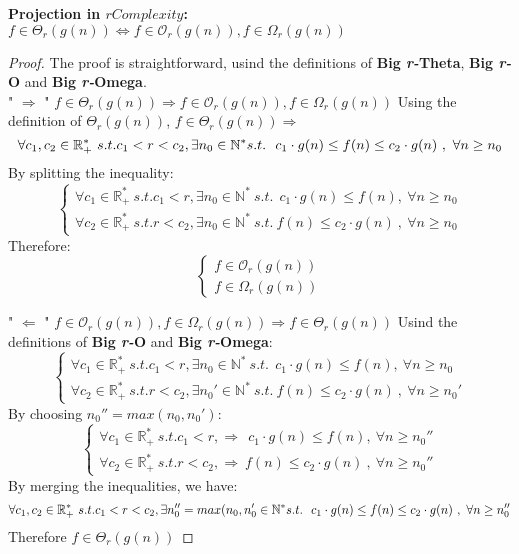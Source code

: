 \begin{theorem}
    \textbf{Projection in $rComplexity$:}  \\  $ f \in \Theta_{r}(g(n)) \Leftrightarrow f \in \mathcal{O}_{r}(g(n)), f \in \Omega_{r}(g(n)) $
\end{theorem}
\begin{proof}
    The proof is straightforward, usind the definitions of \textbf{Big \textit{r-}Theta}, \textbf{Big \textit{r-}O} and \textbf{Big \textit{r-}Omega}. \\
    " $\Rightarrow$ " $ f \in \Theta_{r}(g(n)) \Rightarrow f \in \mathcal{O}_{r}(g(n)), f \in \Omega_{r}(g(n)) $
    Using the definition of $\Theta_{r}(g(n))$, $ f \in \Theta_{r}(g(n)) \Rightarrow$
    \[\forall c_{1}, c_{2} \in \mathbb{R}^{*}_{+} \ s.t. c_{1} < r < c_{2} , \exists n_{0} \in \mathbb{N}^{*}\ \\ s.t.\ \ c_{1} \cdot g(n) \leq f(n) \leq c_{2} \cdot g(n)\ ,\  \forall n \geq n_{0} \]
    By splitting the inequality:
    \[\begin{cases}
          \forall c_{1} \in \mathbb{R}^{*}_{+} \ s.t. c_{1} < r , \exists n_{0} \in \mathbb{N}^{*}\ s.t.\ \ c_{1} \cdot g(n) \leq f(n) ,\  \forall n \geq n_{0} \\ \forall  c_{2} \in \mathbb{R}^{*}_{+} \ s.t. r < c_{2} , \exists n_{0} \in \mathbb{N}^{*}\ s.t.\ f(n) \leq c_{2} \cdot g(n)\ ,\  \forall n \geq n_{0}
    \end{cases}\]
    Therefore:
    \[\begin{cases}
          f \in \mathcal{O}_{r}(g(n)) \\ f \in \Omega_{r}(g(n))
    \end{cases}\]

    " $\Leftarrow$ " $ f \in \mathcal{O}_{r}(g(n)), f \in \Omega_{r}(g(n)) \Rightarrow f \in \Theta_{r}(g(n)) $
    Usind the definitions of \textbf{Big \textit{r-}O} and \textbf{Big \textit{r-}Omega}:
    \[\begin{cases}
          \forall c_{1} \in \mathbb{R}^{*}_{+} \ s.t. c_{1} < r , \exists n_{0} \in \mathbb{N}^{*}\ s.t.\ \ c_{1} \cdot g(n) \leq f(n) ,\  \forall n \geq n_{0} \\ \forall  c_{2} \in \mathbb{R}^{*}_{+} \ s.t. r < c_{2} , \exists n_{0}' \in \mathbb{N}^{*}\ s.t.\ f(n) \leq c_{2} \cdot g(n)\ ,\  \forall n \geq n_{0}'
    \end{cases}\]
    By choosing $n_{0}'' = max(n_{0}, n_{0}')$:
    \[\begin{cases}
          \forall c_{1} \in \mathbb{R}^{*}_{+} \ s.t. c_{1} < r ,\Rightarrow\ \ c_{1} \cdot g(n) \leq f(n) ,\  \forall n \geq n_{0}'' \\ \forall  c_{2} \in \mathbb{R}^{*}_{+} \ s.t. r < c_{2} , \Rightarrow \ f(n) \leq c_{2} \cdot g(n)\ ,\  \forall n \geq n_{0}''
    \end{cases}\]
    By merging the inequalities, we have:
    \[\forall c_{1}, c_{2} \in \mathbb{R}^{*}_{+} \ s.t. c_{1} < r < c_{2} , \exists n_{0}'' = max(n_{0}, n_{0}' \in \mathbb{N}^{*}\ \\ s.t.\ \ c_{1} \cdot g(n) \leq f(n) \leq c_{2} \cdot g(n)\ ,\  \forall n \geq n_{0}'' \]
    Therefore $f \in \Theta_{r}(g(n))$
\end{proof}


